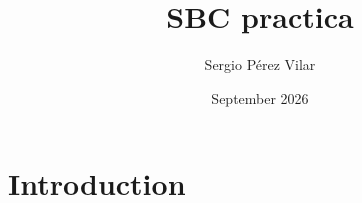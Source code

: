 \documentclass{article}
\title{SBC practica}
\author{Sergio Pérez Vilar}
\date{September 2026}
\begin{document}
\maketitle

\section{Introduction}
\end{document}
